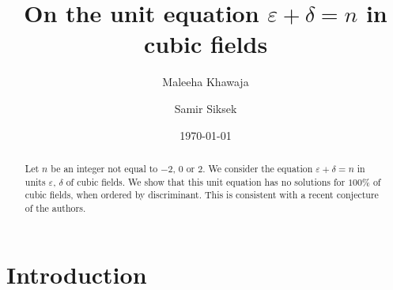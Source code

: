 \documentclass{amsart}
\theoremstyle{definition}
\theoremstyle{remark}
\begin{document}
\title[]{
On the unit equation $\varepsilon+\delta=n$ in cubic fields
}

\begin{abstract}
Let $n$ be an integer not equal to $-2$, $0$ or $2$.
We consider the equation $\varepsilon+\delta=n$ in units $\varepsilon$, $\delta$ of cubic fields.
We show that this unit equation has no solutions for $100\%$ of cubic fields, when ordered by discriminant.
This is consistent with a recent conjecture of the authors.
\end{abstract}

\author{Maleeha Khawaja}

\address{Mathematics Institute\\
    University of Warwick\\
    CV4 7AL \\
    United Kingdom}


\author{Samir Siksek}

\address{Mathematics Institute\\
    University of Warwick\\
    CV4 7AL \\
    United Kingdom}



\date{\today}


\maketitle


\section{Introduction}
\end{document}
